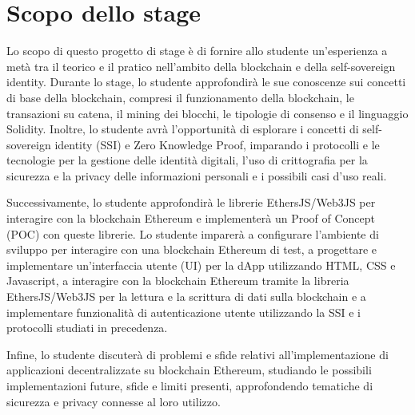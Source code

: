 \section*{Scopo dello stage}

Lo scopo di questo progetto di stage è di fornire allo studente un'esperienza a metà tra il teorico e il pratico nell'ambito della blockchain e della self-sovereign identity.
Durante lo stage, lo studente approfondirà le sue conoscenze sui concetti di base della blockchain, compresi il funzionamento della blockchain, 
le transazioni su catena, il mining dei blocchi, le tipologie di consenso e il linguaggio Solidity. Inoltre, lo studente avrà l'opportunità di
esplorare i concetti di self-sovereign identity (SSI) e Zero Knowledge Proof, imparando i protocolli e le tecnologie per la gestione delle identità digitali,
l'uso di crittografia per la sicurezza e la privacy delle informazioni personali e i possibili casi d'uso reali.

\medskip 

Successivamente, lo studente approfondirà le librerie EthersJS/Web3JS per interagire con la blockchain Ethereum e implementerà un Proof of Concept (POC) 
con queste librerie. Lo studente imparerà a configurare l'ambiente di sviluppo per interagire con una 
blockchain Ethereum di test, a progettare e implementare un'interfaccia utente (UI) per la dApp utilizzando HTML, 
CSS e Javascript, a interagire con la blockchain Ethereum tramite la libreria EthersJS/Web3JS 
per la lettura e la scrittura di dati sulla blockchain e a implementare funzionalità di autenticazione utente 
utilizzando la SSI e i protocolli studiati in precedenza.

\medskip

Infine, lo studente discuterà di problemi e sfide relativi all'implementazione di applicazioni decentralizzate su blockchain Ethereum, studiando 
le possibili implementazioni future, sfide e limiti presenti, approfondendo tematiche di sicurezza e privacy connesse al loro utilizzo.

\newpage


